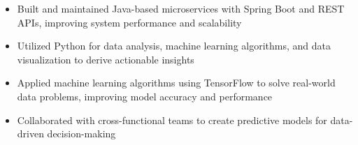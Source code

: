 \par\bigskip
{}
\par\smallskip
\begin{minipage}{13.75cm}
  \begin{minipage}{6.5cm}
    \begin{itemize}
      \item Built and maintained Java-based microservices with Spring Boot and REST APIs, improving system performance and scalability
      \item Utilized Python for data analysis, machine learning algorithms, and data visualization to derive actionable insights
    \end{itemize}
  \end{minipage}
  \hfill
  \begin{minipage}{6.5cm}
    \begin{itemize}
      \item Applied machine learning algorithms using TensorFlow to solve real-world data problems, improving model accuracy and performance
      \item Collaborated with cross-functional teams to create predictive models for data-driven decision-making
    \end{itemize}
  \end{minipage}
\end{minipage}
\par\smallskip
\divider

